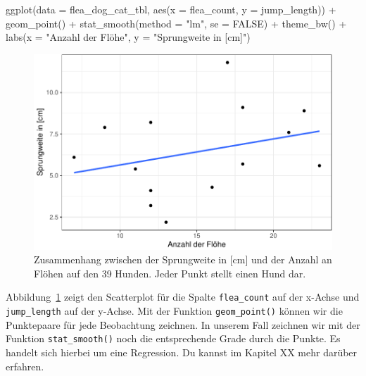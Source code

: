 \documentclass[
  letterpaper,
  DIV=11,
  oneside]{scrreport}
\newenvironment{Shaded}{\begin{snugshade}}{\end{snugshade}}
\newcommand{\AttributeTok}[1]{\textcolor[rgb]{0.40,0.45,0.13}{#1}}
\newcommand{\ConstantTok}[1]{\textcolor[rgb]{0.56,0.35,0.01}{#1}}
\newcommand{\FunctionTok}[1]{\textcolor[rgb]{0.28,0.35,0.67}{#1}}
\newcommand{\NormalTok}[1]{\textcolor[rgb]{0.00,0.23,0.31}{#1}}
\newcommand{\SpecialCharTok}[1]{\textcolor[rgb]{0.37,0.37,0.37}{#1}}
\newcommand{\StringTok}[1]{\textcolor[rgb]{0.13,0.47,0.30}{#1}}
\begin{document}
\begin{Shaded}
\begin{Highlighting}[]
\FunctionTok{ggplot}\NormalTok{(}\AttributeTok{data =}\NormalTok{ flea\_dog\_cat\_tbl, }\FunctionTok{aes}\NormalTok{(}\AttributeTok{x =}\NormalTok{ flea\_count, }\AttributeTok{y =}\NormalTok{ jump\_length)) }\SpecialCharTok{+}
  \FunctionTok{geom\_point}\NormalTok{() }\SpecialCharTok{+}
  \FunctionTok{stat\_smooth}\NormalTok{(}\AttributeTok{method =} \StringTok{"lm"}\NormalTok{, }\AttributeTok{se =} \ConstantTok{FALSE}\NormalTok{) }\SpecialCharTok{+}
  \FunctionTok{theme\_bw}\NormalTok{() }\SpecialCharTok{+}
  \FunctionTok{labs}\NormalTok{(}\AttributeTok{x =} \StringTok{"Anzahl der Flöhe"}\NormalTok{, }\AttributeTok{y =} \StringTok{"Sprungweite in [cm]"}\NormalTok{) }
\end{Highlighting}
\end{Shaded}

\begin{figure}[H]

{\centering \includegraphics{./eda-ggplot_files/figure-pdf/fig-scatter-flea-0-1.pdf}

}

\caption{\label{fig-scatter-flea-0}Zusammenhang zwischen der Sprungweite
in {[}cm{]} und der Anzahl an Flöhen auf den 39 Hunden. Jeder Punkt
stellt einen Hund dar.}

\end{figure}

Abbildung~\ref{fig-scatter-flea-0} zeigt den Scatterplot für die Spalte
\texttt{flea\_count} auf der x-Achse und \texttt{jump\_length} auf der
y-Achse. Mit der Funktion \texttt{geom\_point()} können wir die
Punktepaare für jede Beobachtung zeichnen. In unserem Fall zeichnen wir
mit der Funktion \texttt{stat\_smooth()} noch die entsprechende Grade
durch die Punkte. Es handelt sich hierbei um eine Regression. Du kannst
im Kapitel XX mehr darüber erfahren.
\end{document}
